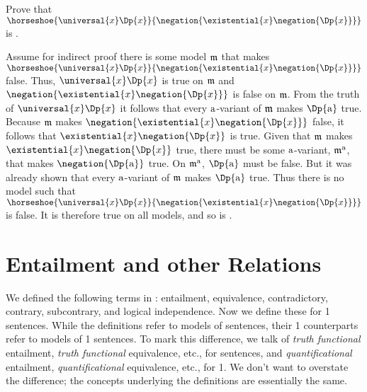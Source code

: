 \begin{majorILnc}{}
Prove that $\horseshoe{\universal{\variable{x}}\Dp{\variable{x}}}{\negation{\existential{\variable{x}}\negation{\Dp{\variable{x}}}}}$ is .
\end{majorILnc}
\begin{PROOF}
Assume for indirect proof there is some model $\mathfrak{m}$ that makes $\horseshoe{\universal{\variable{x}}\Dp{\variable{x}}}{\negation{\existential{\variable{x}}\negation{\Dp{\variable{x}}}}}$ false.
Thus, $\universal{\variable{x}}\Dp{\variable{x}}$ is true on $\mathfrak{m}$ and $\negation{\existential{\variable{x}}\negation{\Dp{\variable{x}}}}$ is false on $\mathfrak{m}$. 
From the truth of $\universal{\variable{x}}\Dp{\variable{x}}$ it follows that every $\mathrm{a}$-variant of $\mathfrak{m}$ makes $\Dp{\constant{a}}$ true.
Because $\mathfrak{m}$ makes $\negation{\existential{\variable{x}}\negation{\Dp{\variable{x}}}}$ false, it follows that $\existential{\variable{x}}\negation{\Dp{\variable{x}}}$ is true.  Given that $\mathfrak{m}$ makes $\existential{\variable{x}}\negation{\Dp{\variable{x}}}$ true, there must be some $\mathrm{a}$-variant, $\mathfrak{m^{\mathrm{\mathrm{a}}}_{\mathrm{}}}$, that makes $\negation{\Dp{\constant{a}}}$ true.
On $\mathfrak{m^{\mathrm{\mathrm{a}}}_{\mathrm{}}}$, $\Dp{\constant{a}}$ must be false.
But it was already shown that every $\mathrm{a}$-variant of $\mathfrak{m}$ makes $\Dp{\constant{a}}$ true.
Thus there is no model such that $\horseshoe{\universal{\variable{x}}\Dp{\variable{x}}}{\negation{\existential{\variable{x}}\negation{\Dp{\variable{x}}}}}$ is false.
It is therefore true on all models, and so is .
\end{PROOF}


\section{Entailment and other Relations}\label{GQL1 Entailment and other Relations}

We defined the following terms in \GSL{}: entailment, equivalence, contradictory, contrary, subcontrary, and logical independence. 
Now we define these for \GQL{}1 sentences. 
While the \GSL{} definitions refer to models of \GSL{} sentences, their \GQL{}1 counterparts refer to models of \GQL{}1 sentences. 
To mark this difference, we talk of \emph{truth functional} entailment, \emph{truth functional} equivalence, etc., for \GSL{} sentences, and \emph{quantificational} entailment, \emph{quantificational} equivalence, etc., for \GQL{}1. 
We don't want to overstate the difference; the concepts underlying the definitions are essentially the same.

